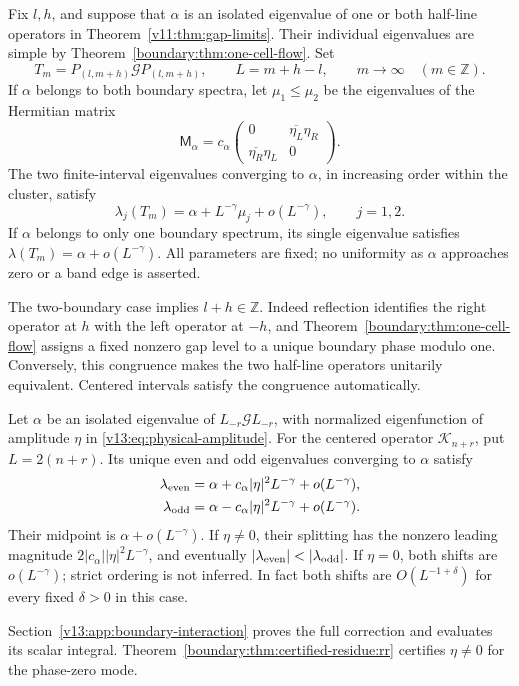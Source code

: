 \begin{theorem}
\label{v13:thm:leading-interaction}
Fix $l,h$, and suppose that $\alpha$ is an isolated eigenvalue of one
or both half-line operators in Theorem~\ref{v11:thm:gap-limits}.
Their individual eigenvalues are simple by
Theorem~\ref{boundary:thm:one-cell-flow}.  Set
\[
 T_m=P_{(l,m+h)}\mathcal G P_{(l,m+h)},\qquad L=m+h-l,
 \qquad m\longrightarrow\infty\quad(m\in\mathbb Z).
\]
If $\alpha$ belongs to both boundary spectra, let $\mu_1\le\mu_2$
be the eigenvalues of the Hermitian matrix
\begin{equation}\label{v13:eq:closed-interaction-matrix}
 \mathsf M_\alpha=c_\alpha
 \begin{pmatrix}0&\overline{\eta_L}\eta_R\\
                 \overline{\eta_R}\eta_L&0\end{pmatrix}.
\end{equation}
The two finite-interval eigenvalues converging to $\alpha$, in
increasing order within the cluster, satisfy
\begin{equation}\label{v13:eq:leading-cluster-law}
 \lambda_j(T_m)=\alpha+L^{-\gamma}\mu_j+o(L^{-\gamma}),
 \qquad j=1,2.
\end{equation}
If $\alpha$ belongs to only one boundary spectrum, its single
eigenvalue satisfies $\lambda(T_m)=\alpha+o(L^{-\gamma})$.
All parameters are fixed; no uniformity as $\alpha$ approaches zero
or a band edge is asserted.
\end{theorem}

The two-boundary case implies $l+h\in\mathbb Z$.
Indeed reflection identifies the right operator at $h$ with the left
operator at $-h$, and Theorem~\ref{boundary:thm:one-cell-flow}
assigns a fixed nonzero gap level to a unique boundary phase modulo one.
Conversely, this congruence makes the two half-line operators unitarily
equivalent. Centered intervals satisfy the congruence automatically.

\begin{corollary}
\label{v13:cor:leading-parity-splitting}
Let $\alpha$ be an isolated eigenvalue of $L_{-r}\mathcal G L_{-r}$,
with normalized eigenfunction of amplitude $\eta$ in
\eqref{v13:eq:physical-amplitude}.  For the centered operator
$\mathcal K_{n+r}$, put $L=2(n+r)$.  Its unique even and odd
eigenvalues converging to $\alpha$ satisfy
\begin{align}
 \lambda_{\rm even}
   &=\alpha+c_\alpha|\eta|^2L^{-\gamma}+o(L^{-\gamma}),\nonumber\\
 \lambda_{\rm odd}
   &=\alpha-c_\alpha|\eta|^2L^{-\gamma}+o(L^{-\gamma}).
 \label{v13:eq:closed-parity-law}
\end{align}
Their midpoint is $\alpha+o(L^{-\gamma})$.  If $\eta\ne0$, their
splitting has the nonzero leading magnitude
$2|c_\alpha||\eta|^2L^{-\gamma}$, and eventually
$|\lambda_{\rm even}|<|\lambda_{\rm odd}|$.
If $\eta=0$, both shifts are $o(L^{-\gamma})$; strict ordering is
not inferred.  In fact both shifts are $O(L^{-1+\delta})$ for every
fixed $\delta>0$ in this case.
\end{corollary}

Section~\ref{v13:app:boundary-interaction} proves the full correction
and evaluates its scalar integral. Theorem~\ref{boundary:thm:certified-residue:rr}
certifies $\eta\ne0$ for the phase-zero mode.

